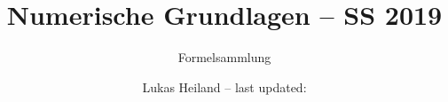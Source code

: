 \documentclass{scrartcl}
\begin{document}
	
	
	\title{Numerische Grundlagen -- SS 2019}
	\subtitle{Formelsammlung}
	\author{Lukas Heiland -- last updated:}
	
	\maketitle
	
	\pagebreak
	
	\tableofcontents
	
	\pagebreak
	
	
	
	
	
	
\end{document}
